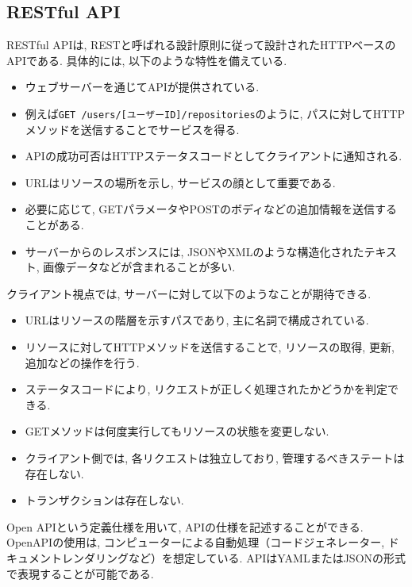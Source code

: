 \documentclass[../../../main]{subfiles}
\begin{document}
    \subsection{RESTful API}\label{subsec:phraseology-restful-api}

    RESTful APIは, RESTと呼ばれる設計原則に従って設計されたHTTPベースのAPIである. 具体的には, 以下のような特性を備えている. \cite{RealWorldHTTP}

    \begin{itemize}
        \item ウェブサーバーを通じてAPIが提供されている.
        \item 例えば\texttt{GET /users/[ユーザーID]/repositories}のように, パスに対してHTTPメソッドを送信することでサービスを得る.
        \item APIの成功可否はHTTPステータスコードとしてクライアントに通知される.
        \item URLはリソースの場所を示し, サービスの顔として重要である.
        \item 必要に応じて, GETパラメータやPOSTのボディなどの追加情報を送信することがある.
        \item サーバーからのレスポンスには, JSONやXMLのような構造化されたテキスト, 画像データなどが含まれることが多い.
    \end{itemize}

    クライアント視点では, サーバーに対して以下のようなことが期待できる. \cite{RealWorldHTTP}

    \begin{itemize}
        \item URLはリソースの階層を示すパスであり, 主に名詞で構成されている.
        \item リソースに対してHTTPメソッドを送信することで, リソースの取得, 更新, 追加などの操作を行う.
        \item ステータスコードにより, リクエストが正しく処理されたかどうかを判定できる.
        \item GETメソッドは何度実行してもリソースの状態を変更しない.
        \item クライアント側では, 各リクエストは独立しており, 管理するべきステートは存在しない.
        \item トランザクションは存在しない.
    \end{itemize}

    Open APIという定義仕様を用いて, APIの仕様を記述することができる. OpenAPIの使用は, コンピューターによる自動処理（コードジェネレーター, ドキュメントレンダリングなど）を想定している. APIはYAMLまたはJSONの形式で表現することが可能である. \cite{APIデザインパターン}
\end{document}
